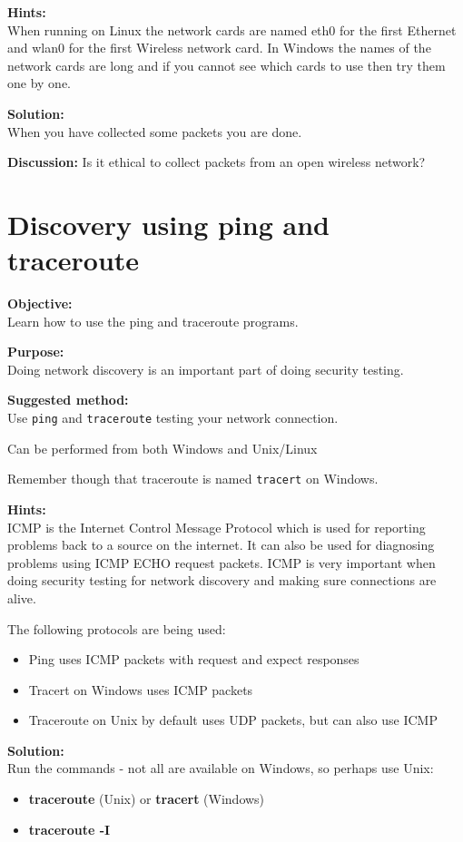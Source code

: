 \documentclass[a4paper,11pt,notitlepage]{report}
\begin{document}
{\bf Hints:}\\
When running on Linux the network cards are named eth0 for the first Ethernet and wlan0 for the first Wireless network card. In Windows the names of the network cards are long and if you cannot see which cards to use then try them one by one.

{\bf Solution:}\\
When you have collected some packets you are done.

{\bf Discussion:}
Is it ethical to collect packets from an open wireless network?

\chapter{Discovery using ping and traceroute}
\label{ex:ping}

{\bf Objective:}\\
Learn how to use the ping and traceroute programs.

{\bf Purpose:}\\
Doing network discovery is an important part of doing security testing.

{\bf Suggested method:} \\
Use \verb+ping+ and \verb+traceroute+ testing your network connection.

Can be performed from both Windows and Unix/Linux

Remember though that traceroute is named \verb+tracert+ on Windows.

{\bf Hints:} \\
ICMP is the Internet Control Message Protocol which is used for reporting problems back to a source on the internet. It can also be used for diagnosing problems using ICMP ECHO request packets. ICMP is very important when doing security testing for network discovery and making sure connections are alive.

The following protocols are being used:
\begin{itemize}
\item Ping uses ICMP packets with request and expect responses
\item Tracert on Windows uses ICMP packets
\item Traceroute on Unix by default uses UDP packets, but can also use ICMP
\end{itemize}

{\bf Solution:}\\
Run the commands - not all are available on Windows, so perhaps use Unix:
\begin{itemize}
\item {\bf traceroute} (Unix) or {\bf tracert} (Windows)
\item {\bf traceroute -I}\\
\end{itemize}
\end{document}
